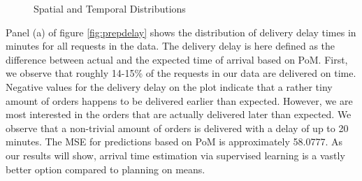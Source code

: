 \begin{figure}[h]
	\centering
	\caption{Spatial and Temporal Distributions}
	\label{fig:dists}
\end{figure}
 
Panel (a) of figure \ref{fig:prepdelay} shows the distribution of delivery delay times in minutes for all requests in the data. The delivery delay is here defined as the difference between actual and the expected time of arrival based on PoM. First, we observe that roughly 14-15\% of the requests in our data are delivered on time. Negative values for the delivery delay on the plot indicate that a rather tiny amount of orders happens to be delivered earlier than expected. However, we are most interested in the orders that are actually delivered later than expected. We observe that a non-trivial amount of orders is delivered with a delay of up to 20 minutes. The MSE for predictions based on PoM is approximately 58.0777.  As our results will show, arrival time estimation via supervised learning is a vastly better option compared to planning on means.

